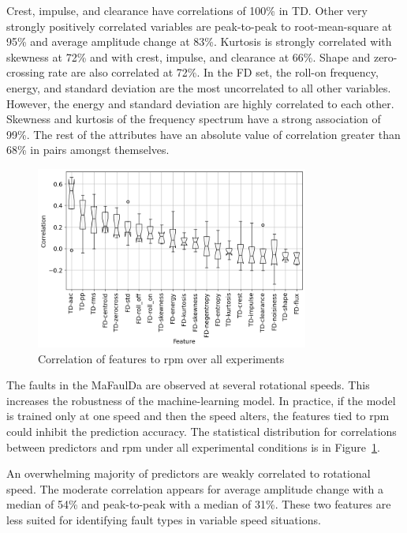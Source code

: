 Crest, impulse, and clearance have correlations of 100\% in TD. Other very strongly positively correlated variables are peak-to-peak to root-mean-square at 95\% and average amplitude change at 83\%. Kurtosis is strongly correlated with skewness at 72\% and with crest, impulse, and clearance at 66\%. Shape and zero-crossing rate are also correlated at 72\%. In the FD set, the roll-on frequency, energy, and standard deviation are the most uncorrelated to all other variables. However, the energy and standard deviation are highly correlated to each other. Skewness and kurtosis of the frequency spectrum have a strong association of 99\%. The rest of the attributes have an absolute value of correlation greater than 68\% in pairs amongst themselves.

\begin{figure}[h]
    \centering
    \includegraphics[width=0.8\textwidth]{assets/results/feature-values/corr-to-rpm.png}
    \caption{Correlation of features to rpm over all experiments}
    \label{fig:design:rpm-corr}
\end{figure}

The faults in the MaFaulDa are observed at several rotational speeds. This increases the robustness of the machine-learning model. In practice, if the model is trained only at one speed and then the speed alters, the features tied to rpm could inhibit the prediction accuracy. The statistical distribution for correlations between predictors and rpm under all experimental conditions is in Figure~\ref{fig:design:rpm-corr}.

An overwhelming majority of predictors are weakly correlated to rotational speed. The moderate correlation appears for average amplitude change with a median of 54\% and peak-to-peak with a median of 31\%. These two features are less suited for identifying fault types in variable speed situations.

